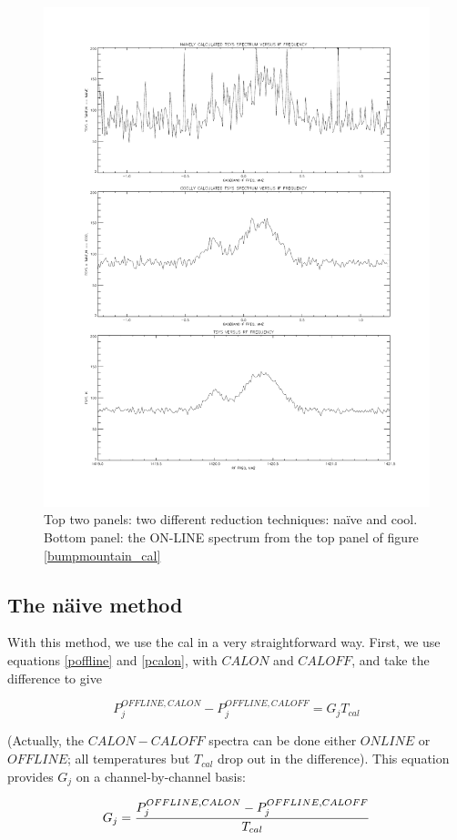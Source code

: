 \documentclass[preprint]{aastex}
\begin{document}
\begin{figure}[p!]
\centering
\includegraphics[width=5in]{bmp_cal.pdf}

\caption{ Top two panels: two different reduction techniques: na\"ive
and cool. Bottom panel: the ON-LINE spectrum from the top panel of
figure \ref{bumpmountain_cal} \label{bmp_cal}}

\end{figure}

\subsection{The n\"aive method}

	With this method, we use the cal in a very straightforward way.
First, we use equations \ref{poffline} and \ref{pcalon}, with $CALON$ and
$CALOFF$,  and take the difference to give

\begin{mathletters}
\begin{equation} \label{naive1}
P_j^{OFFLINE,CALON} - P_j^{OFFLINE,CALOFF} =  G_j T_{cal}
\end{equation}

\noindent (Actually, the $CALON-CALOFF$ spectra can be done either $ONLINE$
or $OFFLINE$; all temperatures but $T_{cal}$ drop out in the difference).
This equation provides $G_j$ on a channel-by-channel basis:

\begin{equation} \label{naive2}
G_j = {P_j^{OFFLINE,CALON} - P_j^{OFFLINE,CALOFF} \over T_{cal}}
\end{equation}
\end{mathletters}
\end{document}
